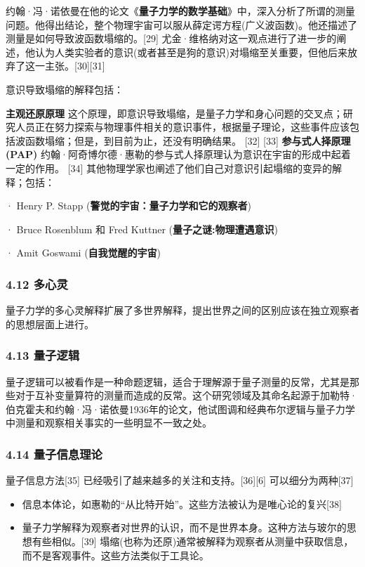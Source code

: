 约翰·冯·诺依曼在他的论文《\textbf{量子力学的数学基础}》中，深入分析了所谓的测量问题。他得出结论，整个物理宇宙可以服从薛定谔方程(广义波函数)。他还描述了测量是如何导致波函数塌缩的。[29] 尤金·维格纳对这一观点进行了进一步的阐述，他认为人类实验者的意识(或者甚至是狗的意识)对塌缩至关重要，但他后来放弃了这一主张。[30][31]

意识导致塌缩的解释包括：

\textbf{主观还原原理}
这个原理，即意识导致塌缩，是量子力学和身心问题的交叉点；研究人员正在努力探索与物理事件相关的意识事件，根据量子理论，这些事件应该包括波函数塌缩；但是，到目前为止，还没有明确结果。 [32] [33]
\textbf{参与式人择原理(PAP)}
约翰·阿奇博尔德·惠勒的参与式人择原理认为意识在宇宙的形成中起着一定的作用。 [34]
其他物理学家也阐述了他们自己对意识引起塌缩的变异的解释；包括：

·        Henry P. Stapp (\textbf{警觉的宇宙：量子力学和它的观察者})

·        Bruce Rosenblum 和 Fred Kuttner (\textbf{量子之谜:物理遭遇意识})

·        Amit Goswami (\textbf{自我觉醒的宇宙})

\subsubsection{4.12 多心灵}

量子力学的多心灵解释扩展了多世界解释，提出世界之间的区别应该在独立观察者的思想层面上进行。

\subsubsection{4.13 量子逻辑}

量子逻辑可以被看作是一种命题逻辑，适合于理解源于量子测量的反常，尤其是那些对于互补变量算符的测量而造成的反常。这个研究领域及其命名起源于加勒特·伯克霍夫和约翰·冯·诺依曼1936年的论文，他试图调和经典布尔逻辑与量子力学中测量和观察相关事实的一些明显不一致之处。

\subsubsection{4.14 量子信息理论}

量子信息方法[35] 已经吸引了越来越多的关注和支持。[36][6] 可以细分为两种[37]

\begin{itemize}
\item 信息本体论，如惠勒的“从比特开始”。这些方法被认为是唯心论的复兴[38]
\item 量子力学解释为观察者对世界的认识，而不是世界本身。这种方法与玻尔的思想有些相似。[39] 塌缩(也称为还原)通常被解释为观察者从测量中获取信息，而不是客观事件。这些方法类似于工具论。
\end{itemize}


